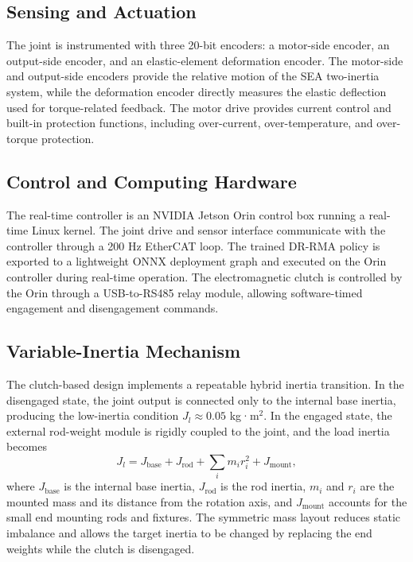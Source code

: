\documentclass[lettersize,journal]{IEEEtran}
\begin{document}
\subsection{Sensing and Actuation}

The joint is instrumented with three 20-bit encoders: a motor-side encoder, an output-side encoder, and an elastic-element deformation encoder. The motor-side and output-side encoders provide the relative motion of the SEA two-inertia system, while the deformation encoder directly measures the elastic deflection used for torque-related feedback. The motor drive provides current control and built-in protection functions, including over-current, over-temperature, and over-torque protection.

\subsection{Control and Computing Hardware}

The real-time controller is an NVIDIA Jetson Orin control box running a real-time Linux kernel. The joint drive and sensor interface communicate with the controller through a 200 Hz EtherCAT loop. The trained DR-RMA policy is exported to a lightweight ONNX deployment graph and executed on the Orin controller during real-time operation. The electromagnetic clutch is controlled by the Orin through a USB-to-RS485 relay module, allowing software-timed engagement and disengagement commands.

\subsection{Variable-Inertia Mechanism}

The clutch-based design implements a repeatable hybrid inertia transition. In the disengaged state, the joint output is connected only to the internal base inertia, producing the low-inertia condition $J_l \approx 0.05$ kg·m$^2$. In the engaged state, the external rod-weight module is rigidly coupled to the joint, and the load inertia becomes
\begin{equation}
J_l = J_{\text{base}} + J_{\text{rod}} + \sum_i m_i r_i^2 + J_{\text{mount}},
\label{eq:testbench_inertia}
\end{equation}
where $J_{\text{base}}$ is the internal base inertia, $J_{\text{rod}}$ is the rod inertia, $m_i$ and $r_i$ are the mounted mass and its distance from the rotation axis, and $J_{\text{mount}}$ accounts for the small end mounting rods and fixtures. The symmetric mass layout reduces static imbalance and allows the target inertia to be changed by replacing the end weights while the clutch is disengaged.
\end{document}
